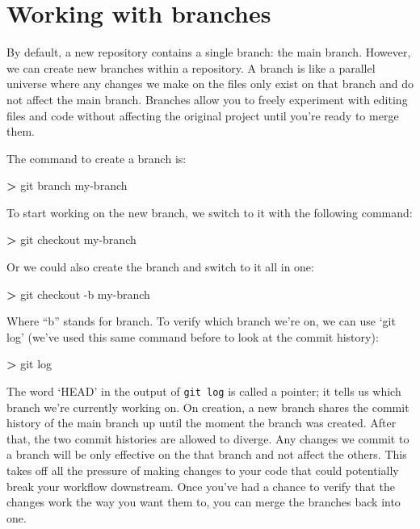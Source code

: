 \documentclass[
]{book}
\newenvironment{Shaded}{\begin{snugshade}}{\end{snugshade}}
\newcommand{\FunctionTok}[1]{\textcolor[rgb]{0.00,0.00,0.00}{#1}}
\newcommand{\NormalTok}[1]{#1}
\newcommand{\OperatorTok}[1]{\textcolor[rgb]{0.81,0.36,0.00}{\textbf{#1}}}
\begin{document}
\hypertarget{working-with-branches}{%
\section{Working with branches}\label{working-with-branches}}

By default, a new repository contains a single branch: the main branch. However, we can create new branches within a repository. A branch is like a parallel universe where any changes we make on the files only exist on that branch and do not affect the main branch. Branches allow you to freely experiment with editing files and code without affecting the original project until you're ready to merge them.

The command to create a branch is:

\begin{Shaded}
\begin{Highlighting}[]
\OperatorTok{>} \FunctionTok{git}\NormalTok{ branch my-branch}
\end{Highlighting}
\end{Shaded}

To start working on the new branch, we switch to it with the following command:

\begin{Shaded}
\begin{Highlighting}[]
\OperatorTok{>} \FunctionTok{git}\NormalTok{ checkout my-branch}
\end{Highlighting}
\end{Shaded}

Or we could also create the branch and switch to it all in one:

\begin{Shaded}
\begin{Highlighting}[]
\OperatorTok{>} \FunctionTok{git}\NormalTok{ checkout -b my-branch}
\end{Highlighting}
\end{Shaded}

Where ``b'' stands for branch. To verify which branch we're on, we can use `git log' (we've used this same command before to look at the commit history):

\begin{Shaded}
\begin{Highlighting}[]
\OperatorTok{>} \FunctionTok{git}\NormalTok{ log }
\end{Highlighting}
\end{Shaded}

The word `HEAD' in the output of \texttt{git\ log} is called a pointer; it tells us which branch we're currently working on. On creation, a new branch shares the commit history of the main branch up until the moment the branch was created. After that, the two commit histories are allowed to diverge. Any changes we commit to a branch will be only effective on the that branch and not affect the others. This takes off all the pressure of making changes to your code that could potentially break your workflow downstream. Once you've had a chance to verify that the changes work the way you want them to, you can merge the branches back into one.
\end{document}
